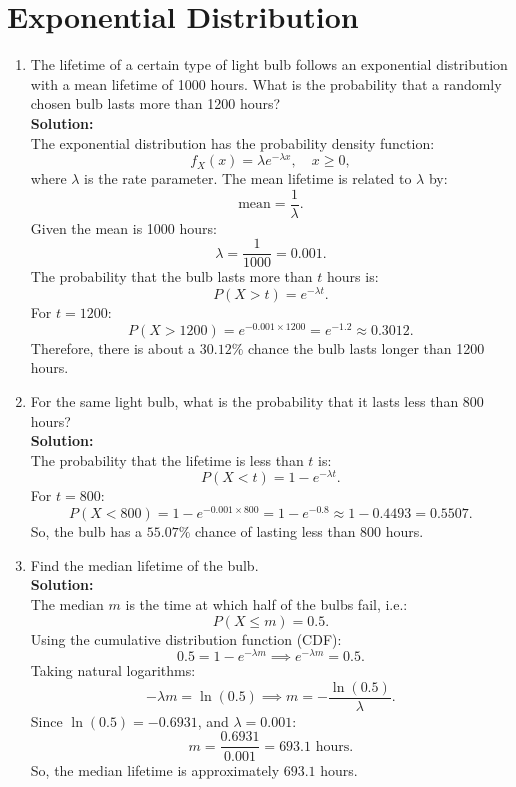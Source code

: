 \documentclass{book}
\begin{document}
\section*{Exponential Distribution}

\begin{enumerate}[label=Exercise \arabic*:]
    \item The lifetime of a certain type of light bulb follows an exponential distribution with a mean lifetime of 1000 hours. What is the probability that a randomly chosen bulb lasts more than 1200 hours? \\
    \textbf{Solution:} \\
    The exponential distribution has the probability density function:
    \[
    f_X(x) = \lambda e^{-\lambda x}, \quad x \geq 0,
    \]
    where \(\lambda\) is the rate parameter. The mean lifetime is related to \(\lambda\) by:
    \[
    \text{mean} = \frac{1}{\lambda}.
    \]
    Given the mean is 1000 hours:
    \[
    \lambda = \frac{1}{1000} = 0.001.
    \]
    The probability that the bulb lasts more than \(t\) hours is:
    \[
    P(X > t) = e^{-\lambda t}.
    \]
    For \(t = 1200\):
    \[
    P(X > 1200) = e^{-0.001 \times 1200} = e^{-1.2} \approx 0.3012.
    \]
    Therefore, there is about a \(\boxed{30.12\%}\) chance the bulb lasts longer than 1200 hours.

    \item For the same light bulb, what is the probability that it lasts less than 800 hours? \\
    \textbf{Solution:} \\
    The probability that the lifetime is less than \(t\) is:
    \[
    P(X < t) = 1 - e^{-\lambda t}.
    \]
    For \(t = 800\):
    \[
    P(X < 800) = 1 - e^{-0.001 \times 800} = 1 - e^{-0.8} \approx 1 - 0.4493 = 0.5507.
    \]
    So, the bulb has a \(\boxed{55.07\%}\) chance of lasting less than 800 hours.

    \item Find the median lifetime of the bulb. \\
    \textbf{Solution:} \\
    The median \(m\) is the time at which half of the bulbs fail, i.e.:
    \[
    P(X \leq m) = 0.5.
    \]
    Using the cumulative distribution function (CDF):
    \[
    0.5 = 1 - e^{-\lambda m} \implies e^{-\lambda m} = 0.5.
    \]
    Taking natural logarithms:
    \[
    -\lambda m = \ln(0.5) \implies m = -\frac{\ln(0.5)}{\lambda}.
    \]
    Since \(\ln(0.5) = -0.6931\), and \(\lambda = 0.001\):
    \[
    m = \frac{0.6931}{0.001} = 693.1 \text{ hours}.
    \]
    So, the median lifetime is approximately \(\boxed{693.1}\) hours.
\end{enumerate}
\end{document}
